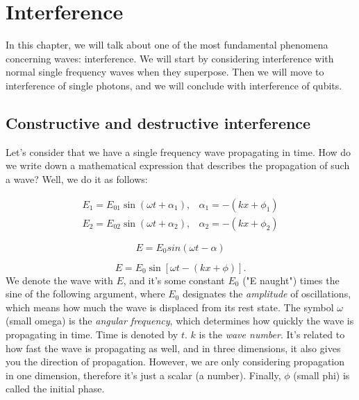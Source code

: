 \chapter{Interference}

In this chapter, we will talk about one of the most fundamental phenomena concerning waves: interference. We will start by considering interference with normal single frequency waves when they superpose. Then we will move to interference of single photons, and we will conclude with interference of qubits.

\section{Constructive and destructive interference}



Let's consider that we have a single frequency wave propagating in time. How do we write down a mathematical expression that describes the propagation of such a wave? Well, we do it as follows:

\begin{equation}
\begin{array}{ll}
E_{1}=E_{01} \sin \left(\omega t+\alpha_{1}\right), & \alpha_{1}=-\left(k x+\phi_{1}\right) \\
E_{2}=E_{02} \sin \left(\omega t+\alpha_{2}\right), & \alpha_{2}=-\left(k x+\phi_{2}\right)
\end{array}
\end{equation}


\begin{equation}
E = E_0 sin(\omega t - \alpha)
\end{equation}
\fi

\begin{equation}
E=E_0 \sin [\omega t-(k x+\phi)].
\end{equation}
We denote the wave with $E$, and it's some constant $E_0$ ("E naught") times the sine of the following argument, where $E_0$ designates the \emph{amplitude} of oscillations, which means how much the wave is displaced from its rest state. The symbol $\omega$ (small omega) is the \emph{angular frequency}, which determines how quickly the wave is propagating in time. Time is denoted by $t$. $k$ is the \emph{wave number}. It's related to how fast the wave is propagating as well, and in three dimensions, it also gives you the direction of propagation. However, we are only considering propagation in one dimension, therefore it's just a scalar (a number). Finally, $\phi$ (small phi) is called the initial phase.

